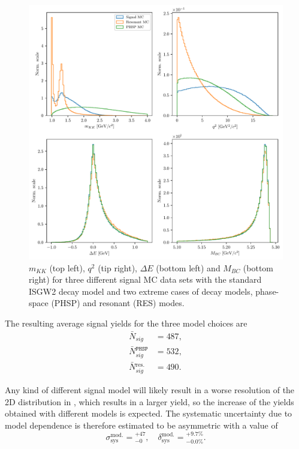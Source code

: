 \begin{figure}[H]
	\centering
	\captionsetup{width=0.8\linewidth}
	\includegraphics[width=\linewidth]{fig/model_cases}
	\caption{$m_{KK}$ (top left), $q^2$ (tip right), $\Delta E$ (bottom left) and $M_{BC}$ (bottom right) for three different signal MC data sets with the standard ISGW2 decay model and two extreme cases of decay models, phase-space (PHSP) and resonant (RES) modes.}
	\label{fig:model_cases}
\end{figure}

The resulting average signal yields for the three model choices are
\begin{align}
\bar N {}_{sig} &= 487, \\
\bar N {}_{sig}^{\mathtt{PHSP}} &= 532, \\
\bar N {}_{sig}^{\mathrm{res.}} &= 490.
\end{align}

Any kind of different signal model will likely result in a worse resolution of the 2D distribution in \vars, which results in a larger yield, so the increase of the yields obtained with different models is expected. The systematic uncertainty due to model dependence is therefore estimated to be asymmetric with a value of 
\begin{equation}
\sigma_{\mathrm{sys}}^{\mathrm{mod.}} = {}^{+47}_{-0},\quad \delta_{\mathrm{sys}}^{\mathrm{mod.}} = {}^{+9.7\%}_{-0.0\%}.
\end{equation}

